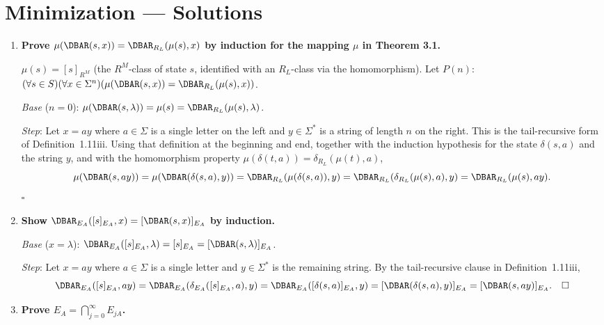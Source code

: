 \chapter{Minimization --- Solutions}

\begin{enumerate}[{3.}1.]

\item \textbf{Prove $\mu(\DBAR(s,x))=\DBAR_{R_L}(\mu(s),x)$ by induction for the mapping $\mu$ in Theorem 3.1.}

$\mu(s)=[s]_{R^M}$ (the $R^M$-class of state $s$, identified with an $R_L$-class via the homomorphism). Let $P(n)$: $(\forall s\in S)(\forall x\in\Sigma^n)(\mu(\DBAR(s,x))=\DBAR_{R_L}(\mu(s),x))$.

\textit{Base} ($n=0$): $\mu(\DBAR(s,\lambda))=\mu(s)=\DBAR_{R_L}(\mu(s),\lambda)$. \checkmark

\textit{Step}: Let $x=ay$ where $a\in\Sigma$ is a single letter on the left and
$y\in\Sigma^*$ is a string of length $n$ on the right. This is the
tail-recursive form of Definition~1.11iii. Using that definition at the
beginning and end, together with the induction hypothesis for the state
$\delta(s,a)$ and the string $y$,
and with the homomorphism property $\mu(\delta(t,a))=\delta_{R_L}(\mu(t),a)$,
\[
\mu(\DBAR(s,ay))=\mu(\DBAR(\delta(s,a),y))=\DBAR_{R_L}(\mu(\delta(s,a)),y)=\DBAR_{R_L}(\delta_{R_L}(\mu(s),a),y)=\DBAR_{R_L}(\mu(s),ay).
\]
$\square$

\item \textbf{Show $\DBAR_{E_A}([s]_{E_A},x)=[\DBAR(s,x)]_{E_A}$ by induction.}

\textit{Base} ($x=\lambda$): $\DBAR_{E_A}([s]_{E_A},\lambda)=[s]_{E_A}=[\DBAR(s,\lambda)]_{E_A}$. \checkmark

\textit{Step}: Let $x=ay$ where $a\in\Sigma$ is a single letter and
$y\in\Sigma^*$ is the remaining string. By the tail-recursive clause in
Definition~1.11iii,
\[
\DBAR_{E_A}([s]_{E_A},ay)=\DBAR_{E_A}(\delta_{E_A}([s]_{E_A},a),y)=\DBAR_{E_A}([\delta(s,a)]_{E_A},y)=[\DBAR(\delta(s,a),y)]_{E_A}=[\DBAR(s,ay)]_{E_A}. \quad\square
\]

\item \textbf{Prove $E_A=\bigcap_{j=0}^\infty E_{jA}$.}


\end{enumerate}
